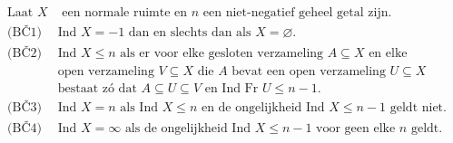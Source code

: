 \documentclass[preview]{standalone}
\begin{document}
\begin{align*}
\text{Laat }X&\text{ een normale ruimte en }n\text{ een niet-negatief geheel getal zijn.}
                           \\\text{(BČ1) }&\text{Ind }X=-1\text{ dan en slechts dan als }X=\varnothing.
                           \\\text{(BČ2) }&\text{Ind }X\leq n\text{ als er voor elke gesloten verzameling }A\subseteq X\text{ en elke}
                                        \\&\text{open verzameling }V\subseteq X\text{ die }A\text{ bevat een open verzameling }U\subseteq X
                                        \\&\text{bestaat zó dat }A\subseteq U\subseteq V\text{ en Ind Fr }U\leq n-1.
                           \\\text{(BČ3) }&\text{Ind }X=n\text{ als Ind }X\leq n\text{ en de ongelijkheid Ind }X\leq n-1\text{ geldt niet.}
                           \\\text{(BČ4) }&\text{Ind }X=\infty\text{ als de ongelijkheid Ind }X\leq n-1\text{ voor geen elke }n\text{ geldt.}
\end{align*}
\end{document}
